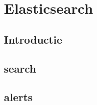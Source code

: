 
\chapter{Elasticsearch}
\label{ch:elasticsearch}


\section{Introductie}
\section{search}
\section{alerts}
